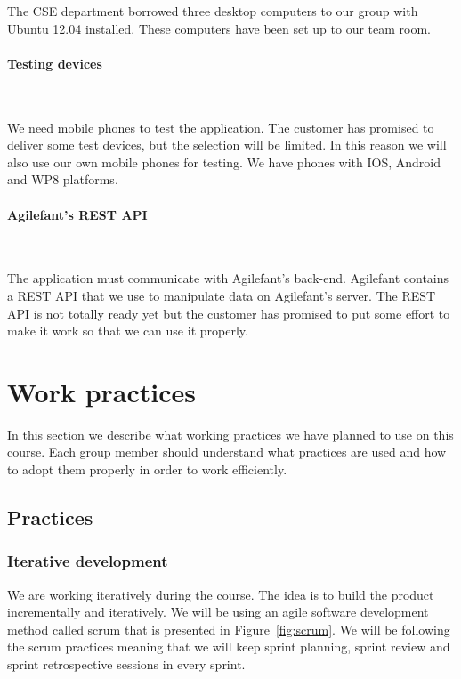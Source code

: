 The CSE department borrowed three desktop computers to our group with Ubuntu
12.04 installed. These computers have been set up to our team room.

\paragraph{Testing devices}~

We need mobile phones to test the application. The customer has promised to
deliver some test devices, but the selection will be limited. In this reason we
will also use our own mobile phones for testing. We have phones with IOS,
Android and WP8 platforms.

\paragraph{Agilefant's REST API}~

The application must communicate with Agilefant's back-end. Agilefant contains a
REST API that we use to manipulate data on Agilefant's server. The REST API is
not totally ready yet but the customer has promised to put some effort to make
it work so that we can use it properly.


\section{Work practices}

In this section we describe what working practices we have planned to use on
this course. Each group member should understand what practices are used and
how to adopt them properly in order to work efficiently.

\subsection{Practices}

\subsubsection{Iterative development}

We are working iteratively during the course. The idea is to build the product
incrementally and iteratively. We will be using an agile software development
method called scrum that is presented in Figure~\ref{fig:scrum}. We will be
following the scrum practices meaning that we will keep sprint planning, sprint review and sprint
retrospective sessions in every sprint.

